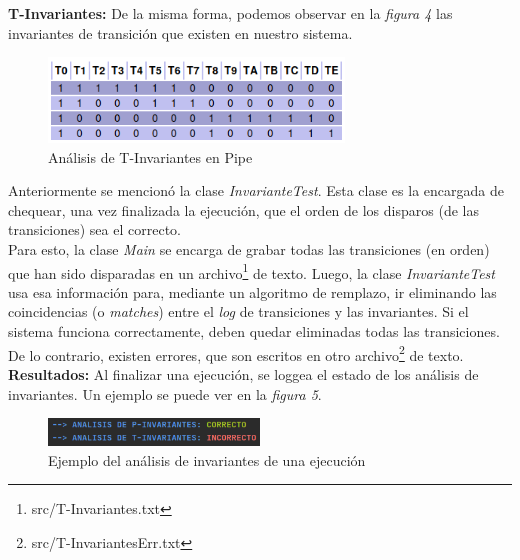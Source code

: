 \documentclass{article}
\begin{document}
\begin{flushleft}
        \textbf{T-Invariantes:} \newline \newline
        De la misma forma, podemos observar en la \emph{figura 4} las invariantes de transición
        que existen en nuestro sistema. \\
        \begin{figure}[h]
            \includegraphics[width=0.7\textwidth, center]{t-invariante.png}
            \caption{Análisis de T-Invariantes en Pipe}
        \end{figure}   
        Anteriormente se mencionó la clase \emph{InvarianteTest}. Esta clase es la encargada
        de chequear, una vez finalizada la ejecución, que el orden de los disparos (de las 
        transiciones) sea el correcto. \\
        Para esto, la clase \emph{Main} se encarga de grabar todas las transiciones (en orden) 
        que han sido disparadas en un archivo\footnote{src/T-Invariantes.txt} de texto. Luego, la
        clase \emph{InvarianteTest} usa esa información para, mediante un algoritmo de remplazo,
        ir eliminando las coincidencias (o \emph{matches}) entre el \emph{log} de transiciones y
        las invariantes. Si el sistema funciona correctamente, deben quedar eliminadas todas las
        transiciones. De lo contrario, existen errores, que son escritos en otro 
        archivo\footnote{src/T-InvariantesErr.txt} de texto. \newline \newline
        \textbf{Resultados:} \newline \newline
        Al finalizar una ejecución, se loggea el estado de los análisis de invariantes. Un ejemplo
        se puede ver en la \emph{figura 5}. \\
        \begin{figure}[h]
            \includegraphics[width=0.5\textwidth, center]{analisis-invariantes-ej.png}
            \caption{Ejemplo del análisis de invariantes de una ejecución}
        \end{figure}

\end{flushleft}
\end{document}
